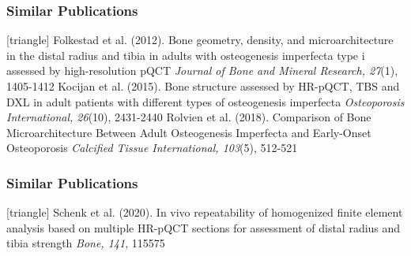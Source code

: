 \documentclass[xcolor=table]{beamer}
\begin{document}

\begin{frame}
	\frametitle{Similar Publications}
	\footnotesize{
		\begin{thebibliography}{99}
			[triangle]
			 Folkestad et al. (2012).
			\newblock Bone geometry, density, and microarchitecture in the distal radius and tibia in adults with osteogenesis imperfecta type i assessed by high-resolution pQCT
			\newblock \textit{Journal of Bone and Mineral Research, 27}(1), 1405-1412
			\vspace{1mm}
			 Kocijan et al. (2015).
			\newblock Bone structure assessed by HR-pQCT, TBS and DXL in adult patients with different types of osteogenesis imperfecta
			\newblock \textit{Osteoporosis International, 26}(10), 2431-2440
			\vspace{1mm}
			 Rolvien et al. (2018).
			\newblock Comparison of Bone Microarchitecture Between Adult Osteogenesis Imperfecta and Early-Onset Osteoporosis
			\newblock \textit{Calcified Tissue International, 103}(5), 512-521
		\end{thebibliography}
	}
\end{frame}


\begin{frame}
	\frametitle{Similar Publications}
	\footnotesize{
		\begin{thebibliography}{99}
			[triangle]
			 Schenk et al. (2020).
			\newblock In vivo repeatability of homogenized finite element analysis based on multiple HR-pQCT sections for assessment of distal radius and tibia strength
			\newblock \textit{Bone, 141}, 115575
		\end{thebibliography}
	}
\end{frame}


\end{document}
